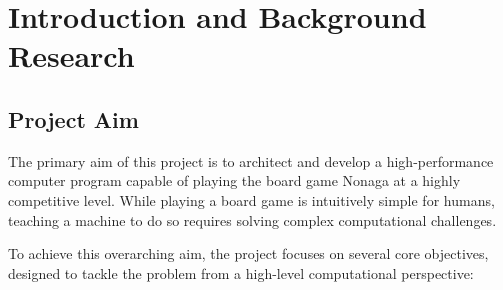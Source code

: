 \chapter{Introduction and Background Research}

\label{chapter1}


\section{Project Aim}
\label{sec:aim}

The primary aim of this project is to architect and develop a high-performance computer program capable of playing the board game Nonaga at a highly competitive level. While playing a board game is intuitively simple for humans, teaching a machine to do so requires solving complex computational challenges.

To achieve this overarching aim, the project focuses on several core objectives, designed to tackle the problem from a high-level computational perspective:

